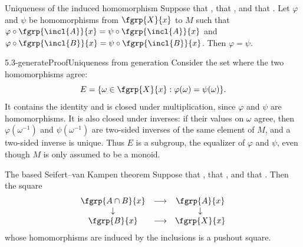 \begin{proposition}[id=5.3]{Uniqueness of the induced homomorphism}
Suppose that \hypCoverTwo, that \hypPathConnected, and that \hypBasepoint.  Let
$\varphi$ and $\psi$ be homomorphisms from $\fgrp{X}{x}$ to $M$ such that
$\varphi \circ \fgrp{\incl{A}}{x} = \psi \circ \fgrp{\incl{A}}{x}$ and
$\varphi \circ \fgrp{\incl{B}}{x} = \psi \circ \fgrp{\incl{B}}{x}$.  Then
$\varphi = \psi$.
\end{proposition}

\begin{proofpassage}{5.3-generate}{Proof}{Uniqueness from generation}
Consider the set where the two homomorphisms agree:
\[
 E=\{\omega\in\fgrp{X}{x}:\varphi(\omega)=\psi(\omega)\}.
\]
It contains the identity and is closed under multiplication, since
$\varphi$ and $\psi$ are homomorphisms.  It is also closed under inverses:
if their values on $\omega$ agree, then $\varphi(\omega^{-1})$ and
$\psi(\omega^{-1})$ are two-sided inverses of the same element of $M$,
and a two-sided inverse is unique.  Thus $E$ is a subgroup, the equalizer of $\varphi$ and $\psi$, even
though $M$ is only assumed to be a monoid.

  
\end{proofpassage}

\begin{theorem}[id=5.4]{The based Seifert--van Kampen theorem}
Suppose that \hypCoverTwo, that \hypPathConnected, and that \hypBasepoint.  Then
the square
\[
  \begin{array}{ccc}
    \fgrp{A \cap B}{x} & \longrightarrow & \fgrp{A}{x} \\
    \downarrow & & \downarrow \\
    \fgrp{B}{x} & \longrightarrow & \fgrp{X}{x}
  \end{array}
\]
whose homomorphisms are induced by the inclusions is a pushout square.
\end{theorem}

